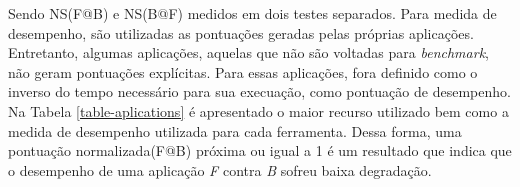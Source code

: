 \begin{table}[!htb]
\centering
\caption{Aplicações utilizadas para geração de cargas e trabalho.}
\label{table-aplications}
\end{table}

Sendo NS(F@B) e  NS(B@F) medidos em dois testes separados. Para medida de
desempenho, são utilizadas as pontuações geradas pelas próprias aplicações.
Entretanto, algumas aplicações, aquelas que não são voltadas para
\textit{benchmark}, não geram pontuações explícitas. Para essas aplicações,
fora definido como o inverso do tempo necessário para sua execuação, como
pontuação de desempenho. Na Tabela \ref{table-aplications} é apresentado o
maior recurso utilizado bem como a medida de desempenho utilizada para cada
ferramenta. Dessa forma, uma pontuação normalizada(F@B) próxima ou igual a 1 é
um resultado que indica que o desempenho de uma aplicação \textit{F} contra
\textit{B} sofreu baixa degradação.

